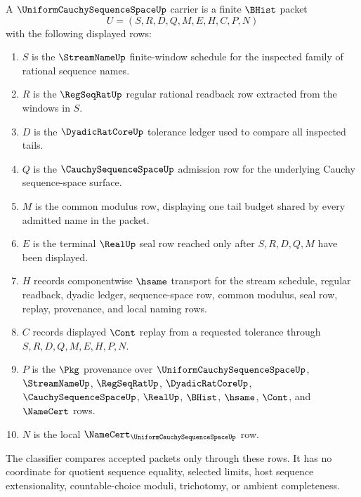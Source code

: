 \begin{definition}
\label{def:uniform-cauchy-sequence-space-carrier}
A $\UniformCauchySequenceSpaceUp$ carrier is a finite $\BHist$ packet
$$
U=(S,R,D,Q,M,E,H,C,P,N)
$$
with the following displayed rows:
\begin{enumerate}
\item $S$ is the $\StreamNameUp$ finite-window schedule for the inspected family of rational sequence names.
\item $R$ is the $\RegSeqRatUp$ regular rational readback row extracted from the windows in $S$.
\item $D$ is the $\DyadicRatCoreUp$ tolerance ledger used to compare all inspected tails.
\item $Q$ is the $\CauchySequenceSpaceUp$ admission row for the underlying Cauchy sequence-space surface.
\item $M$ is the common modulus row, displaying one tail budget shared by every admitted name in the packet.
\item $E$ is the terminal $\RealUp$ seal row reached only after $S,R,D,Q,M$ have been displayed.
\item $H$ records componentwise $\hsame$ transport for the stream schedule, regular readback, dyadic ledger, sequence-space row, common modulus, seal row, replay, provenance, and local naming rows.
\item $C$ records displayed $\Cont$ replay from a requested tolerance through $S,R,D,Q,M,E,H,P,N$.
\item $P$ is the $\Pkg$ provenance over $\UniformCauchySequenceSpaceUp$, $\StreamNameUp$, $\RegSeqRatUp$, $\DyadicRatCoreUp$, $\CauchySequenceSpaceUp$, $\RealUp$, $\BHist$, $\hsame$, $\Cont$, and $\NameCert$ rows.
\item $N$ is the local $\NameCert_{\UniformCauchySequenceSpaceUp}$ row.
\end{enumerate}
The classifier compares accepted packets only through these rows. It has no coordinate for quotient sequence equality, selected limits, host sequence extensionality, countable-choice moduli, trichotomy, or ambient completeness.
\end{definition}


